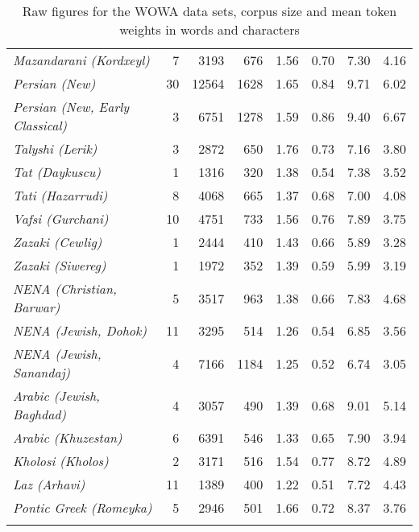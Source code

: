 \documentclass[output=paper,colorlinks,citecolor=brown,collectionchapter]{langscibook}
\begin{document}
\begin{paperappendix}
\begin{table}
{\begin{tabular}{lrrrrrrr}
\textit{Mazandarani (Kordxeyl)} & 7 & 3193 & 676 & 1.56 & 0.70 & 7.30 & 4.16 \\
\textit{Persian (New)} & 30 & 12564 & 1628 & 1.65 & 0.84 & 9.71 & 6.02 \\
\textit{Persian (New, Early Classical)} & 3 & 6751 & 1278 & 1.59 & 0.86 & 9.40 & 6.67 \\
\textit{Talyshi (Lerik)} & 3 & 2872 & 650 & 1.76 & 0.73 & 7.16 & 3.80 \\
\textit{Tat (Daykuscu)} & 1 & 1316 & 320 & 1.38 & 0.54 & 7.38 & 3.52 \\
\textit{Tati (Hazarrudi)} & 8 & 4068 & 665 & 1.37 & 0.68 & 7.00 & 4.08 \\
\textit{Vafsi (Gurchani)} & 10 & 4751 & 733 & 1.56 & 0.76 & 7.89 & 3.75 \\
\textit{Zazaki (Cewlig)} & 1 & 2444 & 410 & 1.43 & 0.66 & 5.89 & 3.28 \\
\textit{Zazaki (Siwereg)} & 1 & 1972 & 352 & 1.39 & 0.59 & 5.99 & 3.19 \\
\textit{NENA (Christian, Barwar)} & 5 & 3517 & 963 & 1.38 & 0.66 & 7.83 & 4.68 \\
\textit{NENA (Jewish, Dohok)} & 11 & 3295 & 514 & 1.26 & 0.54 & 6.85 & 3.56 \\
\textit{NENA (Jewish, Sanandaj)} & 4 & 7166 & 1184 & 1.25 & 0.52 & 6.74 & 3.05 \\
\textit{Arabic (Jewish, Baghdad)} & 4 & 3057 & 490 & 1.39 & 0.68 & 9.01 & 5.14 \\
\textit{Arabic (Khuzestan)} & 6 & 6391 & 546 & 1.33 & 0.65 & 7.90 & 3.94 \\
\textit{Kholosi (Kholos)} & 2 & 3171 & 516 & 1.54 & 0.77 & 8.72 & 4.89 \\
\textit{Laz (Arhavi)} & 11 & 1389 & 400 & 1.22 & 0.51 & 7.72 & 4.43 \\
\textit{Pontic Greek (Romeyka)} & 5 & 2946 & 501 & 1.66 & 0.72 & 8.37 & 3.76 \\
\lspbottomrule
    \end{tabular}}
    \caption{Raw figures for the WOWA data sets, corpus size and mean token weights in words and characters}
    \label{Intro:tab:B1}
\end{table}
\clearpage
{}


\end{paperappendix}
\end{document}
